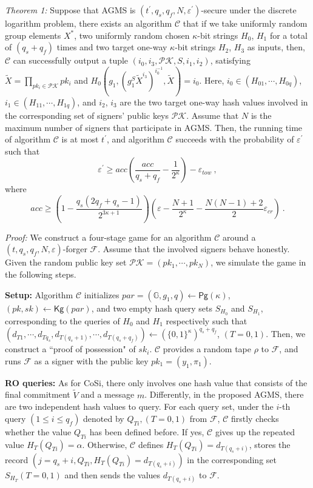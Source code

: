 \documentclass[journal]{IEEEtran}
\begin{document}
\noindent\emph{Theorem 1:} Suppose that AGMS is \((t^\prime,q_s,q_f,N,\varepsilon^\prime)\)-secure under the discrete logarithm problem, there exists an algorithm \(\mathcal{C}\) that if we take uniformly random group elements \(X^\ast\), two uniformly random chosen \(\kappa\)-bit strings \(H_0\), \(H_1\) for a total of \((q_s+q_f)\) times and two target one-way \(\kappa\)-bit strings \(H_2\), \(H_3\) as inputs, then, \(\mathcal{C}\) can successfully output a tuple \((i_0,i_3,\mathcal{PK},S,i_1,i_2)\), satisfying \(\tilde{X}=\prod_{pk_i\in \mathcal{PK}} pk_i\) and  \(H_0(g_1,(g_1^{S}\tilde{X}^{i_3})^{i_0^{-1}},\tilde{X})=i_0\). Here, \(i_0\in (H_{01},\cdots, H_{0 q})\), \(i_1\in (H_{11},\cdots,H_{1 q})\), and \(i_2\), \(i_3\) are the two target one-way hash values involved in the corresponding set of signers' public keys \(\mathcal{PK}\). Assume that \(N\) is the maximum number of signers that participate in AGMS. Then, the running time of algorithm \(\mathcal{C}\) is at most \(t^\prime\), and algorithm \(\mathcal{C}\) succeeds with the probability of \(\varepsilon^\prime\) such that
\begin{equation}
\varepsilon^\prime\geq acc(\frac{acc}{q_s+q_f}-\frac{1}{2^{\kappa}})-\varepsilon_{tow} \ ,\end{equation}
where
\begin{equation}
acc\geq(1-\frac{q_s(2q_f+q_s-1)}{2^{3\kappa+1}})(\varepsilon-\frac{N+1}{2^{\kappa}}-\frac{N(N-1)+2}{2}\varepsilon_{cr}) \ .
\end{equation}

\noindent\emph{Proof:} We construct a four-stage game for an algorithm $\mathcal{C}$ around a $(t,q_s,q_f,N,\varepsilon)$-forger $\mathcal{F}$. Assume that the involved signers behave honestly. Given the random public key set \(\mathcal{PK}=(pk_1,\cdots,pk_N)\), we simulate the game in the following steps.

\noindent\textbf{Setup:} Algorithm \(\mathcal{C}\) initializes \(par=(\mathbb{G},g_1,q)\leftarrow \textsf{Pg}(\kappa)\), \((pk,sk)\leftarrow \textsf{Kg}(par)\), and two empty hash query sets \(S_{H_0}\) and \(S_{H_1}\), corresponding to the queries of \(H_0\) and \(H_1\) respectively such that \((d_{T1},\cdots, d_{Tq_s},d_{T(q_s+1)},\cdots,d_{T(q_s+q_f)})\leftarrow (\{0,1\}^{\kappa})^{q_s+q_f}\), \((T=0,1)\). Then, we construct a ``proof of possession" of \(sk_i\). \(\mathcal{C}\) provides a random tape \(\rho\) to \(\mathcal{F}\), and runs $\mathcal{F}$ as a signer with the public key $pk_1=(y_1,\pi_1)$.

\noindent\textbf{RO queries:} As for CoSi, there only involves one hash value that consists of the final commitment \(\tilde{V}\) and a message \(m\). Differently, in the proposed AGMS, there are two independent hash values to query. For each query set, under the \(i\)-th query \((1\leq i\leq q_f)\) denoted by \(Q_{Ti},(T=0,1)\) from \(\mathcal{F}\), \(\mathcal{C}\) firstly checks whether the value \(Q_{Ti}\) has been defined before. If yes, \(\mathcal{C}\) gives up the repeated value \(H_T(Q_{Ti})=\alpha\). Otherwise, \(\mathcal{C}\) defines \(H_T(Q_{Ti})=d_{T(q_s+i)}\), stores the record \((j=q_s+i,Q_{Ti},H_T(Q_{Ti})=d_{T(q_s+i)})\) in the corresponding set \(S_{H_T}(T=0,1)\) and then sends the values \(d_{T(q_s+i)}\) to \(\mathcal{F}\).
\end{document}
